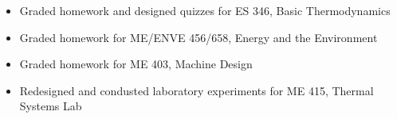 \begin{itemize}
  \item Graded homework and designed quizzes for ES 346, Basic Thermodynamics
  \item Graded homework for ME/ENVE 456/658, Energy and the Environment
  \item Graded homework for ME 403, Machine Design
  \item Redesigned and condusted laboratory experiments for ME 415, Thermal
    Systems Lab
\end{itemize}
